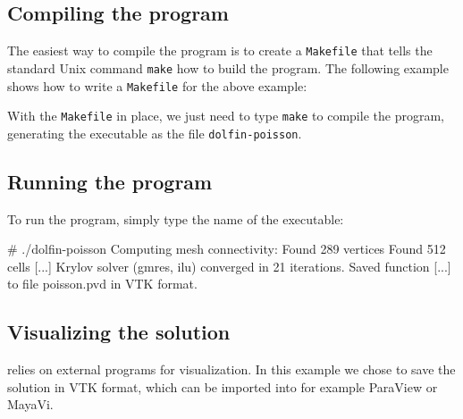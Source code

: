 \subsection{Compiling the program}

The easiest way to compile the program is to create a
\texttt{Makefile} that tells the standard Unix command \texttt{make}
how to build the program. The following example shows how to write a
\texttt{Makefile} for the above example:
\footnotesize
{}
\normalsize

With the \texttt{Makefile} in place, we just need to type
\texttt{make} to compile the program, generating the executable
as the file \texttt{dolfin-poisson}.

\subsection{Running the program}

To run the program, simply type the name of the executable:
\begin{code}
  # ./dolfin-poisson
  Computing mesh connectivity:
  Found 289 vertices
  Found 512 cells
  [...]
  Krylov solver (gmres, ilu) converged in 21 iterations.
  Saved function [...] to file poisson.pvd in VTK format.
\end{code}

\subsection{Visualizing the solution}

\dolfin{} relies on external programs for visualization. In this
example we chose to save the solution in VTK format, which can be
imported into for example ParaView or MayaVi.

